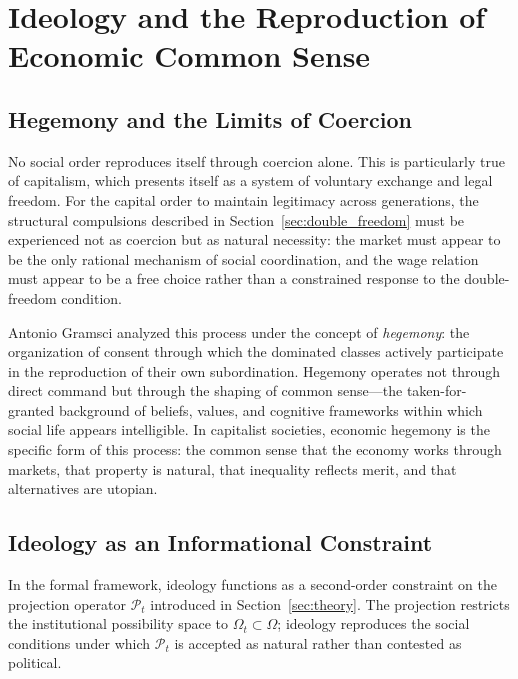 \documentclass[12pt,a4paper]{article}
\theoremstyle{definition}
\theoremstyle{remark}
\begin{document}
\section{Ideology and the Reproduction of Economic Common Sense}
\label{sec:ideology}

\subsection{Hegemony and the Limits of Coercion}

No social order reproduces itself through coercion alone. This is particularly true of capitalism, which presents itself as a system of voluntary exchange and legal freedom. For the capital order to maintain legitimacy across generations, the structural compulsions described in Section~\ref{sec:double_freedom} must be experienced not as coercion but as natural necessity: the market must appear to be the only rational mechanism of social coordination, and the wage relation must appear to be a free choice rather than a constrained response to the double-freedom condition.

Antonio Gramsci analyzed this process under the concept of \emph{hegemony}: the organization of consent through which the dominated classes actively participate in the reproduction of their own subordination. Hegemony operates not through direct command but through the shaping of common sense---the taken-for-granted background of beliefs, values, and cognitive frameworks within which social life appears intelligible. In capitalist societies, economic hegemony is the specific form of this process: the common sense that the economy works through markets, that property is natural, that inequality reflects merit, and that alternatives are utopian.

\subsection{Ideology as an Informational Constraint}

In the formal framework, ideology functions as a second-order constraint on the projection operator $\mathcal{P}_t$ introduced in Section~\ref{sec:theory}. The projection restricts the institutional possibility space to $\Omega_t \subset \Omega$; ideology reproduces the social conditions under which $\mathcal{P}_t$ is accepted as natural rather than contested as political.
\end{document}
